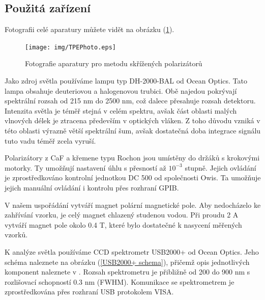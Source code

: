 \subsection{Použitá zařízení}
Fotografii celé aparatury můžete vidět na obrázku (\ref{TPE photo}).

\begin{figure}
\begin{center}
\texttt{[image: img/TPEPhoto.eps]}
\caption{Fotografie aparatury pro metodu skřížených polarizátorů}
\label{TPE photo}
\end{center}
\end{figure}

Jako zdroj světla používáme lampu typ DH-2000-BAL od Ocean Optics. Tato lampa obsahuje deuteriovou a halogenovou trubici. Obě najedou pokrývají spektrální rozsah od 215 nm do 2500 nm, což dalece přesahuje rozsah detektoru. Intenzita světla je téměř stejná v celém spektru, avšak část oblasti malých vlnových délek je ztracena především v optických vláken. Z toho důvodu vzniká v této oblasti výrazně větší spektrální šum, avšak dostatečná doba integrace signálu tuto vadu téměř zcela vyruší.

Polarizátory z CaF a křemene typu Rochon jsou umístěny do držáků s krokovými motorky.  Ty umožňují nastavení úhlu s přesností až $10^{-3}$ stupně. Jejich ovládání je zprostředkováno kontrolní jednotkou DC 500 od společnosti Owis. Ta umožňuje jejich manuální ovládání i kontrolu přes rozhraní GPIB.

V našem uspořádání vytváří magnet polární magnetické pole. Aby nedocházelo ke zahřívání vzorku, je celý magnet chlazený studenou vodou. Při proudu 2 A vytváří magnet pole okolo 0.4 T, které bylo dostatečné k nasycení měřených vzorků. %

K analýze světla používáme CCD spektrometr USB2000+ od Ocean Optics. Jeho schéma naleznete na obrázku (\ref{USB2000+ schema}), přičemž opis jednotlivých komponent naleznete v \cite{USB2000}. Rozsah spektrometru je přibližně od 200 do 900 nm s rozlišovací schopností 0.3 nm (FWHM). Komunikace se spektrometrem je zprostředkována přes rozhraní USB protokolem VISA. 

